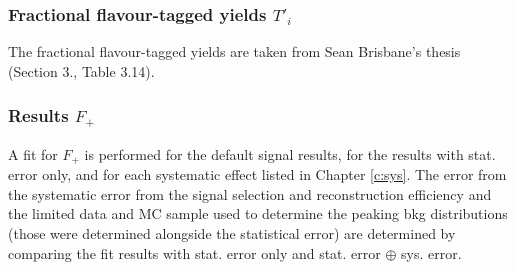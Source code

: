 \subsubsection{Fractional flavour-tagged \KlPiPi yields $T'_i$}
The fractional flavour-tagged \KlPiPi yields are taken from Sean Brisbane's thesis (Section 3., Table 3.14).

\subsubsection{Results $F_+$ }
A fit for $F_+$ is performed for the default signal results, for the results with stat. error only, and for each systematic effect listed in Chapter \ref{c:sys}. The error from the systematic error from the signal selection and reconstruction efficiency and the limited data and MC sample used to determine the peaking bkg distributions (those were determined alongside the statistical error) are determined by comparing the fit results with stat. error only and stat. error $\oplus$ sys. error.
